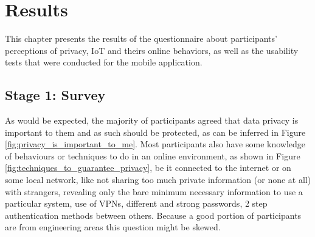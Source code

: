 %
%
\section{Results}\label{section:results}

\par
This chapter presents the results of the questionnaire about participants'
perceptions of privacy, IoT and theirs online behaviors, as well as the usability
tests that were conducted for the mobile application.

\subsection{Stage 1: Survey}

As would be expected, the majority of participants agreed that data privacy
is important to them and as such should be protected, as can be inferred
in Figure \ref{fig:privacy_is_important_to_me}. Most participants
also have some knowledge of behaviours or techniques to do
in an online environment, as shown in Figure \ref{fig:techniques_to_guarantee_privacy}, be it connected to the internet or on some
local network, like not sharing too much private information
(or none at all) with strangers, revealing only the bare minimum necessary
information to use a particular system, use of VPNs, different and strong
passwords, 2 step authentication methods between others. Because a good
portion of participants are from engineering areas this question might be
skewed.


